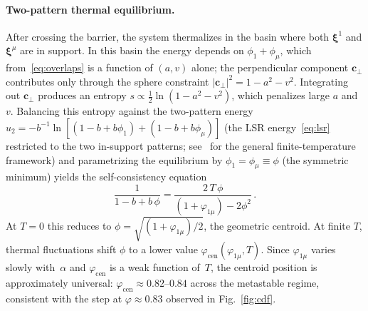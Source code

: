 \documentclass[11pt]{article}
\newcommand{\bxi}{\boldsymbol{\xi}}
\begin{document}
\paragraph{Two-pattern thermal equilibrium.}
After crossing the barrier, the system thermalizes in the basin where both $\bxi^1$ and $\bxi^\mu$ are in support.  In this basin the energy depends on $\phi_1 + \phi_\mu$, which from~\eqref{eq:overlaps} is a function of $(a, v)$ alone; the perpendicular component $\mathbf{c}_\perp$ contributes only through the sphere constraint $|\mathbf{c}_\perp|^2 = 1 - a^2 - v^2$.  Integrating out $\mathbf{c}_\perp$ produces an entropy $s \propto \tfrac{1}{2}\ln(1 - a^2 - v^2)$, which penalizes large $a$ and $v$.  Balancing this entropy against the two-pattern energy $u_2 = -b^{-1}\ln[(1{-}b{+}b\phi_1) + (1{-}b{+}b\phi_\mu)]$ (the LSR energy~\eqref{eq:lsr} restricted to the two in-support patterns; see~\citet{icml2026theory} for the general finite-temperature framework) and parametrizing the equilibrium by $\phi_1 = \phi_\mu \equiv \phi$ (the symmetric minimum) yields the self-consistency equation
\begin{equation}
\frac{1}{1-b+b\,\phi} = \frac{2\,T\,\phi}{(1+\varphi_{1\mu}) - 2\phi^2}\,.
\label{eq:two_pat_sc}
\end{equation}
At $T = 0$ this reduces to $\phi = \sqrt{(1{+}\varphi_{1\mu})/2}$, the geometric centroid.  At finite $T$, thermal fluctuations shift $\phi$ to a lower value $\varphi_{\mathrm{cen}}(\varphi_{1\mu}, T)$.  Since $\varphi_{1\mu}$ varies slowly with~$\alpha$ and $\varphi_{\mathrm{cen}}$ is a weak function of~$T$, the centroid position is approximately universal: $\varphi_{\mathrm{cen}} \approx 0.82$--$0.84$ across the metastable regime, consistent with the step at $\varphi \approx 0.83$ observed in Fig.~\ref{fig:cdf}.
\end{document}
